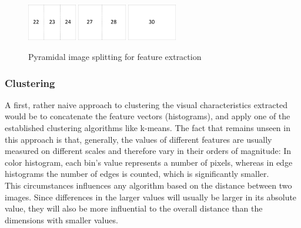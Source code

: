 \begin{figure}[h]
\includegraphics[width=0.19\textwidth]{images/partitioning3v.pdf}
\includegraphics[width=0.19\textwidth]{images/partitioning2v.pdf}
\includegraphics[width=0.19\textwidth]{images/partitioning1v.pdf}
\caption{Pyramidal image splitting for feature extraction}
\label{fig_blackwhite}
\end{figure}



\subsubsection{Clustering}
A first, rather naive approach to clustering the visual characteristics extracted would be to concatenate the feature vectors (histograms), and apply one of the established clustering algorithms like k-means.  The fact that remains unseen in this approach is that, generally, the values of different features are usually measured on different scales and therefore vary in their orders of magnitude: In color histogram, each bin's value represents a number of pixels, whereas in edge histograms the number of edges is counted, which is significantly smaller. \\
This circumstances influences any algorithm based on the distance between two images. Since differences in the larger values will usually be larger in its absolute value, they will also be more influential to the overall distance than the dimensions with smaller values.

